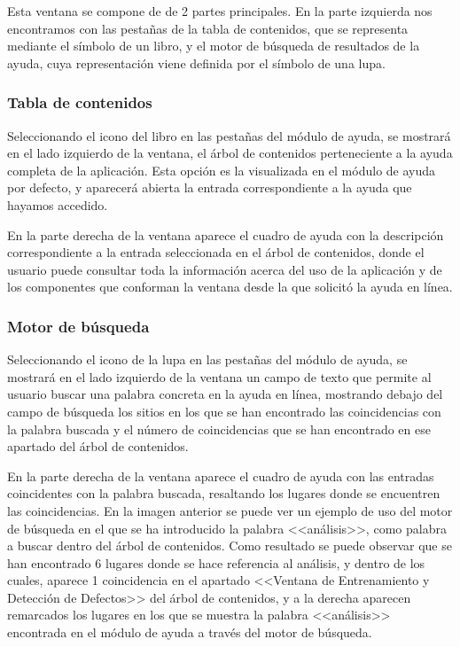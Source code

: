 
Esta ventana se compone de de 2 partes principales. En la parte izquierda nos encontramos con las pestañas de la tabla de contenidos, que se representa mediante el símbolo de un libro, y el motor de búsqueda de resultados de la ayuda, cuya representación viene definida por el símbolo de una lupa.


\subsubsection{Tabla de contenidos}
Seleccionando el icono del libro en las pestañas del módulo de ayuda, se mostrará en el lado izquierdo de la ventana, el árbol de contenidos perteneciente a la ayuda completa de la aplicación. Esta opción es la visualizada en el módulo de ayuda por defecto, y aparecerá abierta la entrada correspondiente a la ayuda  que hayamos accedido.

En la parte derecha de la ventana aparece el cuadro de ayuda con la descripción correspondiente a la entrada seleccionada en el árbol de contenidos, donde el usuario puede consultar toda la información acerca del uso de la aplicación y de los componentes que conforman la ventana desde la que solicitó la ayuda en línea.



\subsubsection{Motor de búsqueda}
Seleccionando el icono de la lupa en las pestañas del módulo de ayuda, se mostrará en el lado izquierdo de la ventana un campo de texto que permite al usuario buscar una palabra concreta en la ayuda en línea, mostrando debajo del campo de búsqueda los sitios en los que se han encontrado las coincidencias con la palabra buscada y el número de coincidencias que se han encontrado en ese apartado del árbol de contenidos.


En la parte derecha de la ventana aparece el cuadro de ayuda con las entradas coincidentes con la palabra buscada, resaltando los lugares donde se encuentren las coincidencias. En la imagen anterior se puede ver un ejemplo de uso del motor de búsqueda en el que se ha introducido la palabra <<análisis>>, como palabra a buscar dentro del árbol de contenidos. Como resultado se puede observar que se han encontrado 6 lugares donde se hace referencia al análisis, y dentro de los cuales, aparece 1 coincidencia en el apartado <<Ventana de Entrenamiento y Detección de Defectos>> del árbol de contenidos, y a la derecha aparecen remarcados los lugares en los que se muestra la palabra <<análisis>> encontrada en el módulo de ayuda a través del motor de búsqueda.

